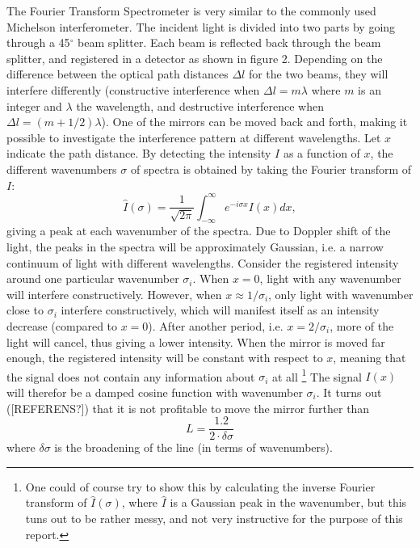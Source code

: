 \documentclass[a4paper]{article}
\begin{document}
The Fourier Transform Spectrometer is very similar to the commonly used Michelson interferometer. The incident light is divided into two parts by going through a 45$^\circ$ beam splitter. Each beam is reflected back through the beam splitter, and registered in a detector as shown in figure 2. Depending on the difference between the optical path distances $\Delta l$ for the two beams, they will interfere differently (constructive interference when $\Delta l = m \lambda$ where $m$ is an integer and $\lambda$ the wavelength, and destructive interference when $\Delta l = (m+ 1/2) \lambda$). One of the mirrors can be moved back and forth, making it possible to investigate the interference pattern at different wavelengths. Let $x$ indicate the path distance. By detecting the intensity $I$ as a function of $x$, the different wavenumbers $\sigma$ of spectra is obtained by taking the Fourier transform of $I$:
\begin{equation}
\hat{I}(\sigma ) = \frac{1}{\sqrt{2\pi }} \int_{-\infty}^{\infty} e^{-i\sigma x} I(x) dx,
\end{equation}
giving a peak at each wavenumber of the spectra. Due to Doppler shift of the light, the peaks in the spectra will be approximately Gaussian, i.e. a narrow continuum of light with different wavelengths. Consider the registered intensity around one particular wavenumber $\sigma_i$. When $x=0$, light with any wavenumber will interfere constructively. However, when $x\approx 1/ \sigma_i$, only light with wavenumber close to $\sigma_i$ interfere constructively, which will manifest itself as an intensity decrease (compared to $x=0$). After another period, i.e. $x=2/\sigma_i$, more of the light will cancel, thus giving a lower intensity. When the mirror is moved far enough, the registered intensity will be constant with respect to $x$, meaning that the signal does not contain any information about $\sigma_i$ at all \footnote{One could of course try to show this by calculating the inverse Fourier transform of $\hat{I}(\sigma)$, where $\hat{I}$ is a Gaussian peak in the wavenumber, but this tuns out to be rather messy, and not very instructive for the purpose of this report.} The signal $I(x)$ will therefor be a damped cosine function with wavenumber $\sigma_i$. It turns out ([REFERENS?]) that it is not profitable to move the mirror further than
\begin{equation}
L = \frac{1.2}{2\cdot \delta \sigma}		%
\end{equation}
where $\delta \sigma$ is the broadening of the line (in terms of wavenumbers). 
\end{document}
